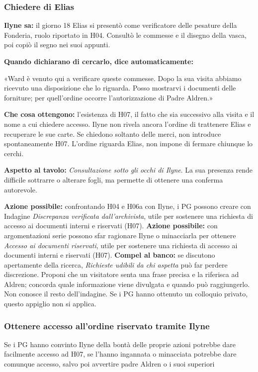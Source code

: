 \documentclass[11pt,a4paper]{article}
\newcommand{\aspect}[1]{\textit{\textcolor{blood}{#1}}}
\begin{document}
\subsubsection{Chiedere di Elias}
\textbf{Ilyne sa:} il giorno 18 Elias si presentò come verificatore delle pesature della Fonderia, ruolo riportato in H04. Consultò le commesse e il disegno della vasca, poi copiò il segno nei suoi appunti.

\textbf{Quando dichiarano di cercarlo, dice automaticamente:}
\begin{readaloud}
«Ward è venuto qui a verificare queste commesse. Dopo la sua visita abbiamo ricevuto una disposizione che lo riguarda. Posso mostrarvi i documenti delle forniture; per quell'ordine occorre l'autorizzazione di Padre Aldren.»
\end{readaloud}

\textbf{Che cosa ottengono:} l'esistenza di H07, il fatto che sia successivo alla visita e il nome a cui chiedere accesso. Ilyne non rivela ancora l'ordine di trattenere Elias e recuperare le sue carte. Se chiedono soltanto delle merci, non introduce spontaneamente H07. L'ordine riguarda Elias, non impone di fermare chiunque lo cerchi.

\begin{fatebox}
\textbf{Aspetto al tavolo:} \aspect{Consultazione sotto gli occhi di Ilyne}. La sua presenza rende difficile sottrarre o alterare fogli, ma permette di ottenere una conferma autorevole.

\textbf{Azione possibile:} confrontando H04 e H06a con Ilyne, i PG possono creare con Indagine \aspect{Discrepanza verificata dall'archivista}, utile per sostenere una richiesta di accesso ai documenti interni e riservati (H07).
\textbf{Azione possibile:} con argomentazioni serie possono sfar ragionare Ilyne o minacciarla per ottenere \aspect{Accesso ai documenti riservati}, utile per sostenere una richiesta di accesso ai documenti interni e riservati (H07).
\textbf{Compel al banco:} se discutono apertamente della ricerca, \aspect{Richieste udibili da chi aspetta} può far perdere discrezione. Proponi che un visitatore senta una frase precisa e la riferisca ad Aldren; concorda quale informazione viene divulgata e quando può raggiungerlo. Non conosce il resto dell'indagine. Se i PG hanno ottenuto un colloquio privato, questo appiglio non si applica.
\end{fatebox}


\subsubsection{Ottenere accesso all'ordine riservato tramite Ilyne}
Se i PG hanno convinto Ilyne della bontà delle proprie azioni potrebbe dare facilmente accesso ad H07, se l'hanno ingannata o minacciata potrebbe dare comunque accesso, salvo poi avvertire padre Aldren o i suoi superiori
\end{document}
